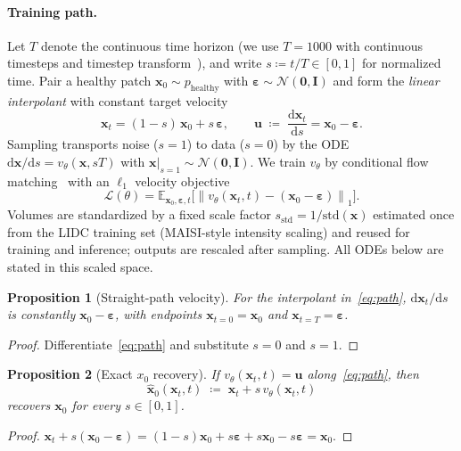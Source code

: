 \documentclass[letterpaper]{article} %
\newtheorem{proposition}{Proposition}
\newcommand{\norm}[1]{\left\|#1\right\|}
\begin{document}
\paragraph{Training path.}
Let \(T\) denote the continuous time horizon (we use \(T{=}1000\) with continuous
timesteps and timestep transform~\cite{esser2024sd3}), and write
\(s\coloneqq t/T\in[0,1]\) for normalized time.
Pair a healthy patch \(\mathbf{x}_0\sim p_{\mathrm{healthy}}\) with
\(\boldsymbol{\varepsilon}\sim\mathcal{N}(\mathbf{0},\mathbf{I})\) and form the
\emph{linear interpolant} with constant target velocity
\begin{equation}
\label{eq:path}
\mathbf{x}_t
=
(1-s)\,\mathbf{x}_0
+
s\,\boldsymbol{\varepsilon},
\qquad
\mathbf{u}
\;\coloneqq\;
\frac{\mathrm{d}\mathbf{x}_t}{\mathrm{d}s}
=
\mathbf{x}_0-\boldsymbol{\varepsilon}.
\end{equation}
Sampling transports noise (\(s{=}1\)) to data (\(s{=}0\)) by the ODE
\(\mathrm{d}\mathbf{x}/\mathrm{d}s=v_\theta(\mathbf{x},sT)\) with
\(\mathbf{x}|_{s=1}\sim\mathcal{N}(\mathbf{0},\mathbf{I})\).
We train \(v_\theta\) by conditional flow matching~\cite{lipman2023flowmatching}
with an \(\ell_1\) velocity objective
\begin{equation}
\label{eq:loss}
\mathcal{L}(\theta)
=
\mathbb{E}_{\mathbf{x}_0,\boldsymbol{\varepsilon},t}
\bigl[
\norm{v_\theta(\mathbf{x}_t,t)-(\mathbf{x}_0-\boldsymbol{\varepsilon})}_1
\bigr].
\end{equation}
Volumes are standardized by a fixed scale factor
\(s_{\mathrm{std}}=1/\mathrm{std}(\mathbf{x})\) estimated once from the
LIDC training set (MAISI-style intensity scaling) and reused for training
and inference; outputs are rescaled after sampling. All ODEs below are
stated in this scaled space.

\begin{proposition}[Straight-path velocity]
\label{prop:velocity}
For the interpolant in~\eqref{eq:path}, \(\mathrm{d}\mathbf{x}_t/\mathrm{d}s\)
is constantly \(\mathbf{x}_0-\boldsymbol{\varepsilon}\), with endpoints
\(\mathbf{x}_{t=0}=\mathbf{x}_0\) and \(\mathbf{x}_{t=T}=\boldsymbol{\varepsilon}\).
\end{proposition}
\begin{proof}
Differentiate~\eqref{eq:path} and substitute \(s{=}0\) and \(s{=}1\).
\end{proof}

\begin{proposition}[Exact \(x_0\) recovery]
\label{prop:x0}
If \(v_\theta(\mathbf{x}_t,t)=\mathbf{u}\) along~\eqref{eq:path}, then
\begin{equation}
\label{eq:x0hat}
\hat{\mathbf{x}}_0(\mathbf{x}_t,t)
\;\coloneqq\;
\mathbf{x}_t + s\,v_\theta(\mathbf{x}_t,t)
\end{equation}
recovers \(\mathbf{x}_0\) for every \(s\in[0,1]\).
\end{proposition}
\begin{proof}
\(\mathbf{x}_t+s(\mathbf{x}_0-\boldsymbol{\varepsilon})
=(1-s)\mathbf{x}_0+s\boldsymbol{\varepsilon}
+s\mathbf{x}_0-s\boldsymbol{\varepsilon}
=\mathbf{x}_0\).
\end{proof}
\end{document}
